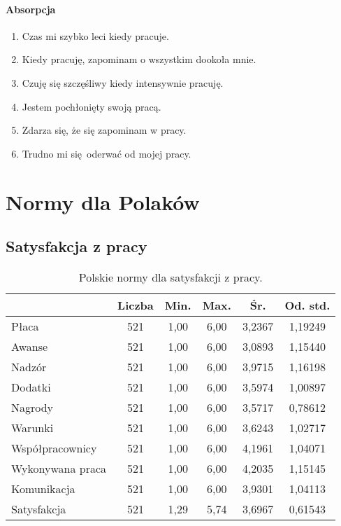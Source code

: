 \paragraph{Absorpcja}
\begin{enumerate}
  \item Czas mi szybko leci kiedy pracuje.
  \item Kiedy pracuję, zapominam o wszystkim dookoła mnie.
  \item Czuję się szczęśliwy kiedy intensywnie pracuję.
  \item Jestem pochłonięty swoją pracą.
  \item Zdarza się, że się zapominam w pracy.
  \item Trudno mi się oderwać od mojej pracy.
\end{enumerate}
\section{Normy dla Polaków}
\subsection{Satysfakcja z pracy}
\label{sec:app-jss-norms}

\begin{table}[h!]
\begin{center}
\begin{tabular}{l | c c c c c}
  & Liczba & Min. & Max. & Śr. & Od. std. \\ \hline
Płaca & 521 & 1,00 & 6,00 & 3,2367 & 1,19249 \\
Awanse & 521 & 1,00 & 6,00 & 3,0893 & 1,15440 \\ 
Nadzór &  521 & 1,00 & 6,00 & 3,9715 & 1,16198 \\
Dodatki &  521 & 1,00 & 6,00 & 3,5974 & 1,00897 \\
Nagrody &  521 & 1,00 & 6,00 & 3,5717 & 0,78612 \\
Warunki &  521 & 1,00 & 6,00 & 3,6243 & 1,02717 \\
Współpracownicy &  521 & 1,00 & 6,00 & 4,1961 & 1,04071 \\
Wykonywana praca &  521 & 1,00 & 6,00 & 4,2035 & 1,15145 \\
Komunikacja & 521 & 1,00 & 6,00 & 3,9301 & 1,04113 \\ \hline
Satysfakcja & 521 & 1,29 & 5,74 & 3,6967 & 0,61543 \\
\end{tabular}
\end{center}
\caption{Polskie normy dla satysfakcji z pracy.}
\label{tab:jss-pl-norms}
\end{table}

